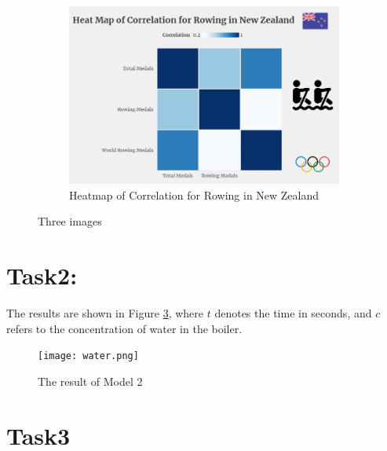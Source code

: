 \documentclass[12pt]{article}  %
\begin{document}
\begin{figure}[htbp]
	\hfill 
	\begin{subfigure}[b]{.32\textwidth}
		\includegraphics[width=\textwidth]{img/New Zealand.png}
		\caption{Heatmap of Correlation for Rowing in New Zealand}\label{subfig:3}
	\end{subfigure}
	\caption{Three images}\label{fig:subfigures}
\end{figure}



\section{Task2:}

The results are shown in Figure \ref{fig:result}, where $t$ denotes the time in seconds, and $c$ refers to the concentration of water in the boiler.

\begin{figure}[htbp]
\centering
\texttt{[image: water.png]}
\caption{The result of Model 2}\label{fig:result}
\end{figure}

\clearpage










\section{Task3}
\end{document}
